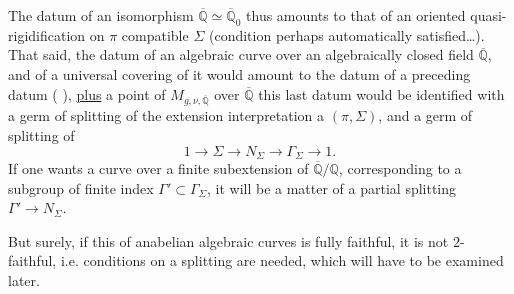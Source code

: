 The datum of an isomorphism $\overline{\mathbb Q}\simeq\overline{\mathbb Q}_0$ thus amounts to that of an oriented quasi-rigidification on $\pi$ compatible  $\Sigma$ (condition perhaps automatically satisfied\ldots).
That said, the datum of an algebraic curve  over   an algebraically closed field $\overline{\mathbb Q}$, and of a universal covering  of it would amount to the datum of a preceding datum ( ), \uline{plus} a point of $M_{g,\nu,\overline{\mathbb Q}}$ over $\overline{\mathbb Q}$   this last datum would be identified with a  germ of splitting of the extension
  interpretation    a $(\pi,\Sigma)$, and a germ of splitting of
\[
1\longrightarrow\Sigma\longrightarrow N_\Sigma\longrightarrow\Gamma_\Sigma\longrightarrow1.
\]
If one wants a curve over a finite subextension  of $\overline{\mathbb Q}/\mathbb Q$, corresponding to a subgroup of finite index $\Gamma'\subset\Gamma_\Sigma$, it will be a matter of a partial  splitting $\Gamma'\longrightarrow N_\Sigma$.


But surely, if this   of anabelian algebraic curves is fully faithful, it is not $2$-faithful, i.e. conditions on a splitting are needed, which will have to be examined later.

